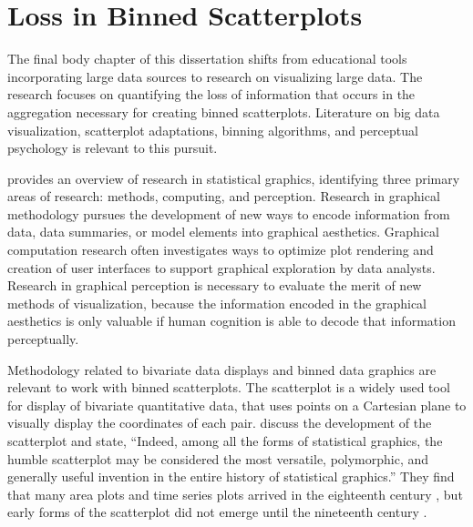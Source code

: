 \documentclass[11pt]{isuthesis}\usepackage[]{graphicx}\usepackage[]{color}
\begin{document}
\section{Loss in Binned Scatterplots}

The final body chapter of this dissertation shifts from educational tools incorporating large data sources to research on visualizing large data. The research focuses on quantifying the loss of information that occurs in the aggregation necessary for creating binned scatterplots. Literature on big data visualization, scatterplot adaptations, binning algorithms, and perceptual psychology is relevant to this pursuit. 

\citet{Cleveland1987} provides an overview of research in statistical graphics, identifying three primary areas of research: methods, computing, and perception. Research in graphical methodology pursues the development of new ways to encode information from data, data summaries, or model elements into graphical aesthetics. Graphical computation research often investigates ways to optimize plot rendering and creation of user interfaces to support graphical exploration by data analysts. Research in graphical perception is necessary to evaluate the merit of new methods of visualization, because the information encoded in the graphical aesthetics is only valuable if human cognition is able to decode that information perceptually. 

Methodology related to bivariate data displays and binned data graphics are relevant to work with binned scatterplots. The scatterplot is a widely used tool for display of bivariate quantitative data, that uses points on a Cartesian plane to visually display the coordinates of each pair. \citet{friendly2005early} discuss the development of the scatterplot and state, ``Indeed, among all the forms of statistical graphics, the humble scatterplot may be considered the most versatile, polymorphic, and generally useful invention in the entire history of statistical graphics.'' They find that many area plots and time series plots arrived in the eighteenth century \citep{playfair}, but early forms of the scatterplot did not emerge until the nineteenth century \citep{Herschel1833}. 
\end{document}
